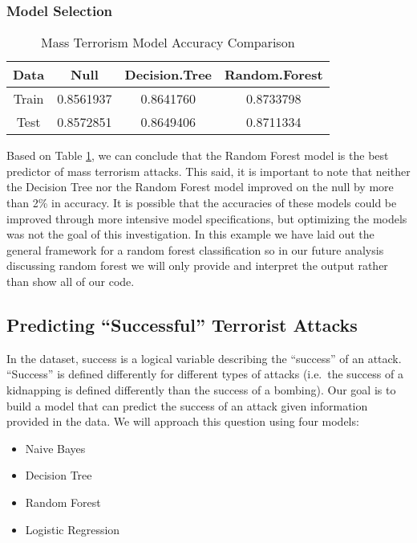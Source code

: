 \documentclass[11pt,letterpaper,]{article}
\providecommand{\tightlist}{%
  \setlength{\itemsep}{0pt}\setlength{\parskip}{0pt}}
\theoremstyle{definition}
\theoremstyle{definition}
\theoremstyle{definition}
\theoremstyle{remark}
\begin{document}
\subsubsection{Model Selection}\label{model-selection}



\begin{table}

\caption{\label{tab:modelCompareJiapeng}Mass Terrorism Model Accuracy Comparison}
\centering
\begin{tabular}[t]{cccc}
\toprule
Data & Null & Decision.Tree & Random.Forest\\
\midrule
Train & 0.8561937 & 0.8641760 & 0.8733798\\
Test & 0.8572851 & 0.8649406 & 0.8711334\\
\bottomrule
\end{tabular}
\end{table}

Based on Table \ref{tab:modelCompareJiapeng}, we can conclude that the
Random Forest model is the best predictor of mass terrorism attacks.
This said, it is important to note that neither the Decision Tree nor
the Random Forest model improved on the null by more than 2\% in
accuracy. It is possible that the accuracies of these models could be
improved through more intensive model specifications, but optimizing the
models was not the goal of this investigation. In this example we have
laid out the general framework for a random forest classification so in
our future analysis discussing random forest we will only provide and
interpret the output rather than show all of our code.

\subsection{\texorpdfstring{Predicting ``Successful'' Terrorist
Attacks}{Predicting Successful Terrorist Attacks}}\label{predicting-successful-terrorist-attacks}

In the dataset, success is a logical variable describing the ``success''
of an attack. ``Success'' is defined differently for different types of
attacks (i.e.~the success of a kidnapping is defined differently than
the success of a bombing). Our goal is to build a model that can predict
the success of an attack given information provided in the data. We will
approach this question using four models:

\begin{itemize}
\tightlist
\item
  Naive Bayes
\item
  Decision Tree
\item
  Random Forest
\item
  Logistic Regression
\end{itemize}
\end{document}
